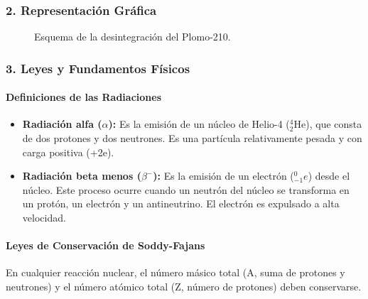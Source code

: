 \subsubsection*{2. Representación Gráfica}
\begin{figure}[H]
    \centering
    \caption{Esquema de la desintegración del Plomo-210.}
\end{figure}

\subsubsection*{3. Leyes y Fundamentos Físicos}
\paragraph{Definiciones de las Radiaciones}
\begin{itemize}
    \item \textbf{Radiación alfa ($\alpha$):} Es la emisión de un núcleo de Helio-4 (${}_{2}^{4}\text{He}$), que consta de dos protones y dos neutrones. Es una partícula relativamente pesada y con carga positiva (+2e).
    \item \textbf{Radiación beta menos ($\beta^{-}$):} Es la emisión de un electrón (${}_{-1}^{0}e$) desde el núcleo. Este proceso ocurre cuando un neutrón del núcleo se transforma en un protón, un electrón y un antineutrino. El electrón es expulsado a alta velocidad.
\end{itemize}

\paragraph{Leyes de Conservación de Soddy-Fajans}
En cualquier reacción nuclear, el número másico total (A, suma de protones y neutrones) y el número atómico total (Z, número de protones) deben conservarse.

